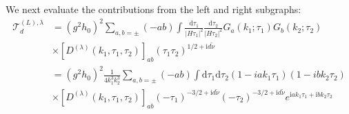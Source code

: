 \documentclass[a4paper,12pt]{article}
\def\di{{\mathrm{d}}}
\def\ii{\mathrm{i}}
\def\tn{\tilde\nu}
\begin{document}
We next evaluate the contributions from the left and right subgraphs:
\begin{align}
    \mathcal{T}^{(L),\lambda}_d &= (g^2h_0)^2 \sum_{a,b=\pm} (-ab) \int \frac{\di \tau_1}{|H \tau_1|^2} \frac{\di \tau_2}{|H \tau_2|^2} G_a(k_1;\tau_1) G_b(k_2;\tau_2) \nonumber \\
    &\times \left[D^{(\lambda)}(k_1,\tau_1,\tau_2)\right]_{ab} (\tau_1\tau_2)^{1/2+\ii d\tn} \\
    &= (g^2h_0)^2  
    \frac{1}{4k_1^3 k_2^3}
    \sum_{a,b=\pm} (-ab)
    \int \di \tau_1 \di \tau_2 
    (1-iak_1\tau_1)(1-ibk_2\tau_2)
    \nonumber \\
    &\times \left[D^{(\lambda)}(k_1,\tau_1,\tau_2)\right]_{ab} 
    (-\tau_1)^{-3/2+\ii d\tn}
    (-\tau_2)^{-3/2+\ii d\tn} 
    e^{\ii ak_1\tau_1 + \ii bk_2\tau_2}
\end{align}
\end{document}

